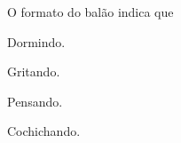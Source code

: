 O formato do balão indica que

\begin{escolha}
\item Dormindo.

\item Gritando.

\item Pensando.

\item Cochichando.
\end{escolha}









